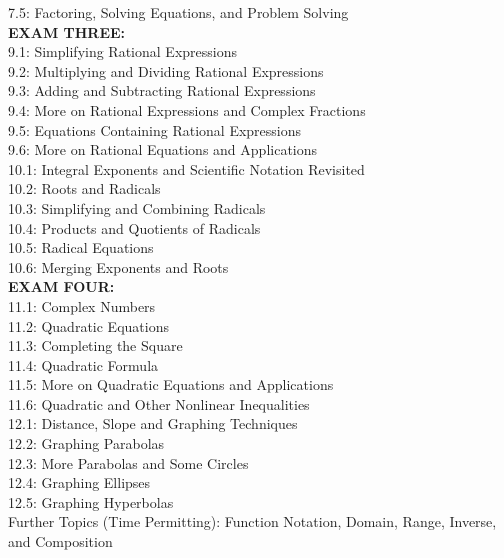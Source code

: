 \documentclass[11pt]{article}
\begin{document}
7.5: Factoring, Solving Equations, and Problem Solving \\
\textbf{EXAM THREE:} \\
9.1: Simplifying Rational Expressions \\
9.2: Multiplying and Dividing Rational Expressions \\
9.3: Adding and Subtracting Rational Expressions \\
9.4: More on Rational Expressions and Complex Fractions \\
9.5: Equations Containing Rational Expressions \\
9.6: More on Rational Equations and Applications \\
10.1: Integral Exponents and Scientific Notation Revisited \\
10.2: Roots and Radicals \\
10.3: Simplifying and Combining Radicals \\
10.4: Products and Quotients of Radicals \\
10.5: Radical Equations \\
10.6: Merging Exponents and Roots \\
\textbf{EXAM FOUR:} \\
11.1: Complex Numbers \\
11.2: Quadratic Equations \\
11.3: Completing the Square \\
11.4: Quadratic Formula \\
11.5: More on Quadratic Equations and Applications \\
11.6: Quadratic and Other Nonlinear Inequalities \\
12.1: Distance, Slope and Graphing Techniques \\
12.2: Graphing Parabolas \\
12.3: More Parabolas and Some Circles \\
12.4: Graphing Ellipses \\
12.5: Graphing Hyperbolas \\
Further Topics (Time Permitting): Function Notation, Domain, Range, Inverse, and Composition
\end{document}
